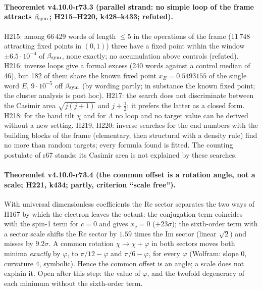 \paragraph{Theoremlet v4.10.0-r73.3 (parallel strand: no simple loop of the frame attracts \(\beta_{\rm sym}\); H215--H220, k428--k433; refuted).}
H215: among 66\,429 words of length \(\le5\) in the operations of the frame (11\,748 attracting fixed points in \((0,1)\)) three have a fixed
point within the window \(\pm6.5\cdot10^{-4}\) of \(\beta_{\rm sym}\), none exactly; no accumulation above controls (refuted).  H216: inverse
loops give a formal excess (240 words against a control median of 46), but 182 of them share the known fixed point \(x_E=0.5493155\) of the
single word \(E\), \(9\cdot10^{-5}\) off \(\beta_{\rm sym}\) (by wording partly; in substance the known fixed point; the cluster analysis is
post hoc).  H217: the search does not discriminate between the Casimir area \(\sqrt{j(j+1)}\) and \(j+\tfrac12\); it prefers the latter as a closed
form.  H218: for the band tilt \(\chi\) and for \(\Lambda\) no loop and no target value can be derived without a new setting.  H219, H220:
inverse searches for the end numbers with the building blocks of the frame (elementary, then structural with a density rule) find no more
than random targets; every formula found is fitted.  The counting postulate of r67 stands; its Casimir area is not explained by these searches.

\paragraph{Theoremlet v4.10.0-r73.4 (the common offset is a rotation angle, not a scale; H221, k434; partly, criterion ``scale free'').}
With universal dimensionless coefficients the Re sector separates the two ways of H167 by which the electron leaves the octant: the
conjugation term coincides with the spin-1 term for \(c=0\) and gives \(x_\nu=0\) (\(+23\sigma\)); the sixth-order term with a sector scale
shifts the Re sector by \(1.59\) times the Im sector (linear \(\sqrt2\)) and misses by \(9.2\sigma\).  A common rotation \(\chi\to\chi+\varphi\) in both
sectors moves both minima \emph{exactly} by \(\varphi\), to \(\pi/12-\varphi\) and \(\pi/6-\varphi\), for every \(\varphi\) (Wolfram: slope 0,
curvature 4, symbolic).  Hence the common offset is an angle; a scale does not explain it.  Open after this step: the value of \(\varphi\), and the
twofold degeneracy of each minimum without the sixth-order term.

